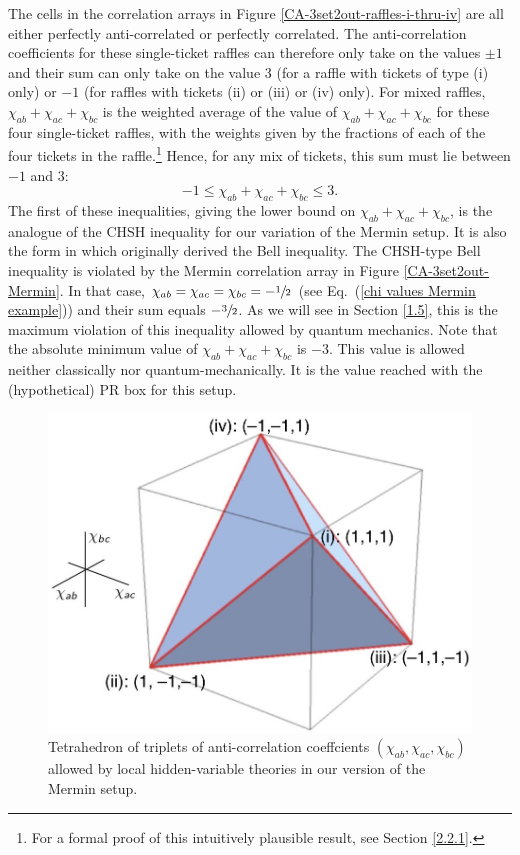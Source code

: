 The cells in the correlation arrays in Figure \ref{CA-3set2out-raffles-i-thru-iv} are all either perfectly anti-correlated or perfectly correlated. The anti-correlation coefficients for these single-ticket raffles can therefore only take on the values $\pm 1$ and their sum can only take on the value 3 (for a raffle with tickets of type (i) only) or $-1$ (for raffles with tickets (ii) or (iii) or (iv) only). For mixed raffles, $\chi_{ab} + \chi_{ac} + \chi_{bc}$ is the weighted average of the value of $\chi_{ab} + \chi_{ac} + \chi_{bc}$ for these four single-ticket raffles, with the weights given by the fractions of each of the four tickets in the raffle.\footnote{For a formal proof of this intuitively plausible result, see Section \ref{2.2.1}.} Hence, for any mix of tickets, this sum must lie between $-1$ and $3$:
\begin{equation}
-1 \le \chi_{ab} + \chi_{ac} + \chi_{bc} \le 3.
\label{Mermin inequality CHSH-like}
\end{equation}
The first of these inequalities, giving the lower bound on $\chi_{ab} + \chi_{ac} + \chi_{bc}$, is the analogue of the CHSH inequality for our variation of the Mermin setup. It is also the form in which \citet{Bell 1964} originally derived the Bell inequality. The CHSH-type Bell inequality is violated by the Mermin correlation array in Figure \ref{CA-3set2out-Mermin}. In that case, $\chi_{ab} = \chi_{ac} = \chi_{bc} = - \sfrac12$ (see Eq.\ (\ref{chi values Mermin example})) and their sum equals $-\sfrac32$. As we will see in Section \ref{1.5}, this is the maximum violation of this inequality allowed by quantum mechanics. Note that the absolute minimum value of $\chi_{ab} + \chi_{ac} + \chi_{bc}$ is $-3$. This value is allowed neither classically nor quantum-mechanically. It is the value reached with the (hypothetical) PR box for this setup.  

\begin{figure}[ht]
 \centering
   \includegraphics[width=4.5in]{tetrahedron.jpeg} 
   \caption{Tetrahedron of triplets of anti-correlation coeffcients $(\chi_{ab}, \chi_{ac}, \chi_{bc})$ allowed by local hidden-variable theories in our version of the Mermin setup.}
   \label{tetrahedron}
\end{figure}

